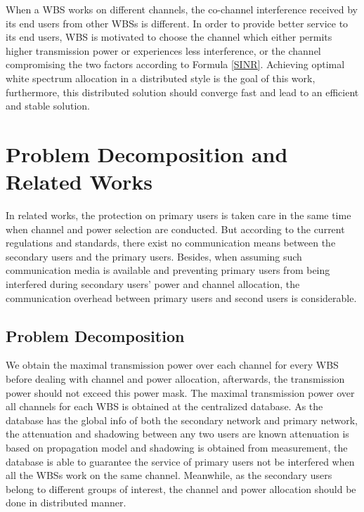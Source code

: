 When a WBS works on different channels, the co-channel interference received by its end users from other WBSs is different.
In order to provide better service to its end users, WBS is motivated to choose the channel which either permits higher transmission power or experiences less interference, or the channel compromising the two factors according to Formula \ref{SINR}.
Achieving optimal white spectrum allocation in a distributed style is the goal of this work, furthermore, this distributed solution should converge fast and lead to an efficient and stable solution.


\section{Problem Decomposition and Related Works}
\label{decomposition_relatedwork}
In related works, the protection on primary users is taken care in the same time when channel and power selection are conducted.
But according to the current regulations and standards, there exist no communication means between the secondary users and the primary users.
Besides, when assuming such communication media is available and preventing primary users from being interfered during secondary users' power and channel allocation, the communication overhead between primary users and second users is considerable.

\subsection{Problem Decomposition}
We obtain the maximal transmission power over each channel for every WBS before dealing with channel and power allocation, afterwards, the transmission power should not exceed this power mask.
The maximal transmission power over all channels for each WBS is obtained at the centralized database.
As the database has the global info of both the secondary network and primary network, the attenuation and shadowing between any two users are known \ie attenuation is based on propagation model and shadowing is obtained from measurement, the database is able to guarantee the service of primary users not be interfered when all the WBSs work on the same channel.
Meanwhile, as the secondary users belong to different groups of interest, the channel and power allocation should be done in distributed manner.

